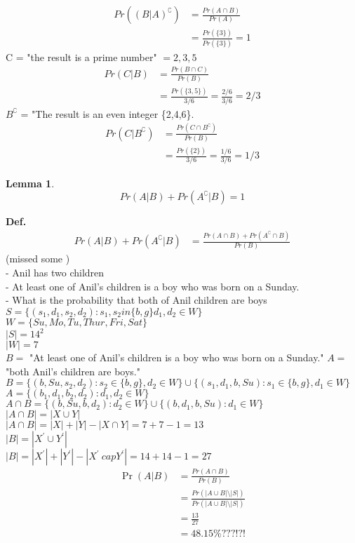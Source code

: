 \documentclass[a4paper,12pt]{article}
\newtheorem{lemma}{Lemma}
\begin{document}
\begin{align*}
    Pr((B|A)^\complement) &= \frac{Pr(A\cap B)}{Pr(A)} \\ 
    &= \frac{Pr(\{3\})}{Pr(\{3\})} = 1   
\end{align*}
C = "the result is a prime number" $= {2,3,5}$\\ 
\begin{align*}
    Pr(C|B) &= \frac{Pr(B \cap C)}{Pr(B)} \\ 
    &= \frac{Pr(\{3,5\})}{3/6} = \frac{2/6}{3/6} = 2/3  
\end{align*}
$B^{\complement}$ = "The result is an even integer \{2,4,6\}.
\begin{align*}
    Pr(C|B^{\complement}) &= \frac{Pr(C \cap B^{\complement})}{Pr(B)} \\ 
    &= \frac{Pr(\{2\})}{3/6} = \frac{1/6}{3/6} = 1/3  
\end{align*}
\begin{lemma}
    $$Pr(A | B) + Pr(A^\complement | B) = 1$$
\end{lemma}
\textbf{Def.}
\begin{align*}
    Pr(A | B) + Pr(A^\complement | B) &= \frac{Pr(A\cap B) + Pr(A^\complement \cap B)}{Pr(B)} 
\end{align*}
(missed some )\\ 
 - Anil has two children \\ 
 - At least one of Anil's children is a boy who was born on a Sunday.\\ 
 - What is the probability that both of Anil children are boys \\
$S = \{(s_{1}, d_{1}, s_{2}, d_{2} ): s_{1}, s_{2} in \{b,g\} d_{1}, d_{2} \in W \}$\\
$W = \{Su, Mo, Tu, Thur, Fri, Sat\}$\\
$|S| = 14^2$\\
$|W| = 7$\\
$B=$ "At least one of Anil's children is a boy who was born on a Sunday."
$A=$ "both Anil's children are boys."\\ 
$B = \{(b,Su, s_{2},d_{2}): s_{2}\in\{b,g\}, d_{2} \in W\} \cup \{(s_{1}, d_{1}, b, Su): s_{1}\in\{b,g\}, d_{1} \in W\}$\\
$A = \{(b_{1}, d_{1}, b_{2}, d_{2}): d_{1}, d_{2} \in W\}$\\ 
$A \cap B = \{(b,Su, b,d_{2}):  d_{2} \in W\} \cup \{(b, d_{1}, b, Su): d_{1} \in W\}$\\
$|A \cap B| = |X \cup Y|$\\ 
$|A \cap B| = |X| + |Y| - |X \cap Y| = 7 + 7 - 1 = 13$\\
$|B| = |X^{'} \cup Y^{'}|$\\ 
$|B| = |X^{'}| + |Y^{'}| - |X^{'} \ cap Y^{'}| = 14 + 14 - 1 = 27$\\

\begin{align*}
    \Pr(A | B) &=  \frac{Pr(A \cap B)}{Pr(B)} \\ 
    &= \frac{Pr(|A\cup B| \setminus |S|)}{Pr(|A\cup B| \setminus |S|)}\\
    &= \frac{13}{27}\\ 
    &= 48.15\% ???!?!
\end{align*}
\end{document}
